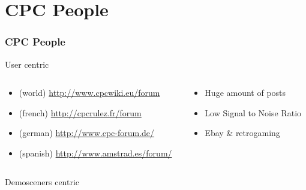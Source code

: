\documentclass{beamer}
\begin{document}
  \section{CPC People}
    \begin{frame}
      \frametitle{CPC People}
      \begin{block}{User centric}
	{ \small
	\begin{columns}
	  \begin{column}{.6\linewidth}
	    {\footnotesize
	    \begin{itemize}
	      \item (world) \url{http://www.cpcwiki.eu/forum}
	      \item (french) \url{http://cpcrulez.fr/forum}	
	      \item (german) \url{http://www.cpc-forum.de/}
	      \item (spanish) \url{http://www.amstrad.es/forum/}
	    \end{itemize}
	    }
	  \end{column}
	  \begin{column}{.35\linewidth}
	    \begin{itemize}
	      \item Huge amount of posts
	      \item Low Signal to Noise Ratio
	      \item Ebay \& retrogaming
	    \end{itemize}
	  \end{column}
	\end{columns}
	}
      \end{block}


      \begin{block}{Demosceners centric}



\end{block}
\end{frame}
\end{document}

